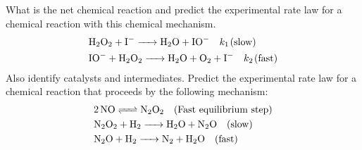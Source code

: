 \documentclass[../main.tex]{subfiles}
\begin{document}
\ProblemSet
What is the net chemical reaction and predict the experimental rate law for a chemical reaction with this chemical mechanism.
\begin{equation*}
    \begin{aligned}
        &\ce{H2O2 + I- ->H2O + IO-} \hspace{1em} k_1 \hspace{0.1em} \text{(slow)} \\
        &\ce{IO- + H2O2 -> H2O + O2 + I-} \hspace{1em} k_2 \hspace{0.1em} \text{(fast)}
    \end{aligned}
\end{equation*}
Also identify catalysts and intermediates.
\ProblemSet
Predict the experimental rate law for a chemical reaction that proceeds by the following mechanism:
\begin{equation*}
    \begin{aligned}
        & \ce{2NO <=> N2O2} \hspace{1em} \text{(Fast equilibrium step)} \\
        & \ce{N2O2 + H2 -> H2O + N2O} \hspace{1em} \text{(slow)} \\
        & \ce{N2O + H2 -> N2 + H2O} \hspace{1em} \text{(fast)} 
    \end{aligned}
\end{equation*}
\end{document}
